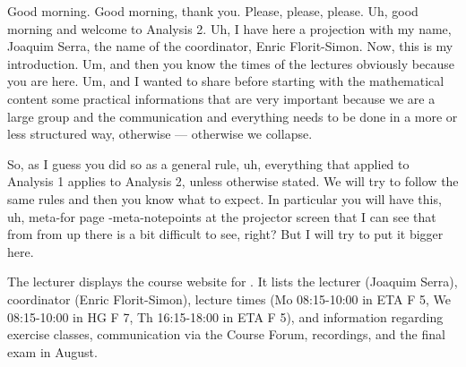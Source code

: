 % 


\begin{spoken-clean}[00:00:00 - 00:01:07]
Good morning. Good morning, thank you. Please, please, please. Uh, good morning and welcome to Analysis 2. Uh, I have here a projection with my name, Joaquim Serra, the name of the coordinator, Enric Florit-Simon. Now, this is my introduction. Um, and then you know the times of the lectures obviously because you are here. Um, and I wanted to share before starting with the mathematical content some practical informations that are very important because we are a large group and the communication and everything needs to be done in a more or less structured way, otherwise --- otherwise we collapse.

So, as I guess you did so as a general rule, uh, everything that applied to Analysis 1 applies to Analysis 2, unless otherwise stated. We will try to follow the same rules and then you know what to expect. In particular you will have this, uh, meta-for page \inline-meta-note{points at the projector screen} that I can see that from from up there is a bit difficult to see, right? But I will try to put it bigger here.
\end{spoken-clean}

\begin{meta-note}
The lecturer displays the course website for . It lists the lecturer (Joaquim Serra), coordinator (Enric Florit-Simon), lecture times (Mo 08:15-10:00 in ETA F 5, We 08:15-10:00 in HG F 7, Th 16:15-18:00 in ETA F 5), and information regarding exercise classes, communication via the Course Forum, recordings, and the final exam in August.
\end{meta-note}

